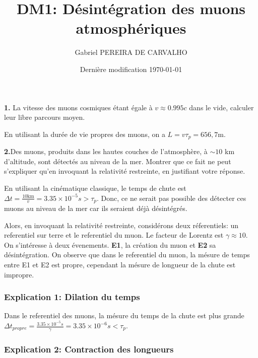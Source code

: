 \documentclass[french]{article}
\begin{document}
	\title{DM1: Désintégration des muons atmosphériques}
	\author{Gabriel PEREIRA DE CARVALHO}
	\date{Dernière modification \today}
	
	\maketitle
	
	\begin{tcolorbox}[colback=gray!5!white,colframe=gray!75!black]
		\textbf{1.} La vitesse des muons cosmiques étant égale à $v \approx 0.995c$ dans le vide, calculer leur libre parcours moyen. 
	\end{tcolorbox}

	En utilisant la durée de vie propres des muons, on a $L = v \tau_p = 656,7 \mathrm{m}$.

	\begin{tcolorbox}[colback=gray!5!white,colframe=gray!75!black]
		\textbf{2.}Des muons, produits dans les hautes couches de l'atmosphère, à $\sim 10$ km d'altitude, sont détectés au niveau de la mer. Montrer que ce fait ne peut s'expliquer qu'en invoquant la relativité restreinte, en justifiant votre réponse.
	\end{tcolorbox}

	En utilisant la cinématique classique, le temps de chute est $\Delta t = \frac{10 \mathrm{km}}{v} = 3.35 \times 10^{-5}s > \tau_p$. Donc, ce ne serait pas possible des détecter ces muons au niveau de la mer car ils seraient déjà désintégrés.

	Alors, en invoquant la relativité restreinte, considérons deux réferentiels: un referentiel sur terre et le referentiel du muon. Le facteur de Lorentz est $\gamma \approx 10$. On s'intéresse à deux évenements. \textbf{E1}, la création du muon et \textbf{E2} sa désintégration. On observe que dans le referentiel du muon, la mésure de temps entre E1 et E2 est propre, cependant la mésure de longueur de la chute est impropre.

	\subsubsection*{Explication 1: Dilation du temps}
	
	Dans le referentiel des muons, la mésure du temps de la chute est plus grande $\Delta t_{propre} = \frac{3.35 \times 10^{-5}s}{\gamma} = 3.35 \times 10^{-6}s < \tau_p$.
	
	\subsubsection*{Explication 2: Contraction des longueurs}
	
\end{document}
